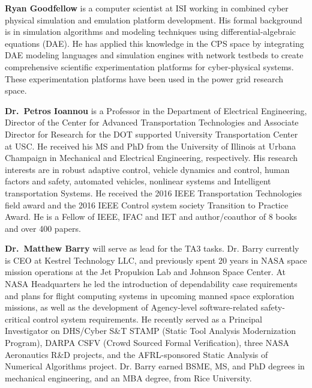 \documentclass[12pt]{dod-blank}
\begin{document}
{\bf Ryan Goodfellow} is a computer scientist at ISI working in combined cyber physical simulation and emulation platform development. His formal background is in simulation algorithms and modeling techniques using differential-algebraic equations (DAE). He has applied this knowledge in the CPS space by integrating DAE modeling languages and simulation engines with network testbeds to create comprehensive scientific experimentation platforms for cyber-physical systems. These experimentation platforms have been used in the power grid research space. %

{\bf Dr.\ Petros Ioannou} is a Professor in the Department of Electrical Engineering, Director of the Center for Advanced Transportation Technologies and Associate Director for Research for the DOT supported University Transportation Center at USC. He received his MS and PhD from the University of Illinois at Urbana Champaign in Mechanical and Electrical Engineering, respectively. His research interests are in robust adaptive control, vehicle dynamics and control, human factors and safety, automated vehicles, nonlinear systems and Intelligent transportation Systems.  He received the 2016 IEEE Transportation Technologies field award and the 2016 IEEE Control system society Transition to Practice Award. He is a Fellow of IEEE, IFAC and IET and author/coauthor of 8 books and over 400 papers.

{\bf Dr.\ Matthew Barry} will serve as lead for the TA3 tasks. %
Dr. Barry currently is CEO at Kestrel Technology LLC, and previously spent 20 years in NASA space mission operations at the Jet Propulsion Lab and Johnson Space Center.  At NASA Headquarters he led the introduction of dependability case requirements and plans for flight computing systems in upcoming manned space exploration missions, as well as the development of Agency-level software-related safety-critical control system requirements.  He recently served as a Principal Investigator on DHS/Cyber S\&T STAMP (Static Tool Analysis Modernization Program), DARPA CSFV (Crowd Sourced Formal Verification), three NASA Aeronautics R\&D projects, and the AFRL-sponsored Static Analysis of Numerical Algorithms project.  Dr. Barry earned BSME, MS, and PhD degrees in mechanical engineering, and an MBA degree, from Rice University.  
\end{document}
